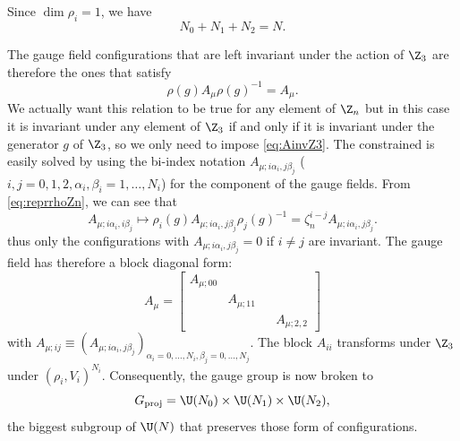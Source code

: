 \documentclass{worksheetclass}
\begin{document}
            Since $\dim\rho_i=1$, we have
            \begin{equation}
                N_0+N_1+N_2=N.\label{eq:sumNiZ3}
            \end{equation} 
            
            The gauge field configurations that are left invariant under the action of $\Z_3$ are therefore the ones that satisfy
            \begin{equation}
                \rho(g)A_\mu\rho(g)^{-1}=A_\mu.\label{eq:AinvZ3}
            \end{equation}
            We actually want this relation to be true for any element of $\Z_n$ but in this case it is invariant under any element of $\Z_3$ if and only if it is invariant under the generator $g$ of $\Z_3$, so we only need to impose \eqref{eq:AinvZ3}. The constrained is easily solved by using the bi-index notation $A_{\mu;i\alpha_i,j\beta_j}$ ($i,j=0,1,2,\alpha_i,\beta_i=1,\dots,N_i$) for the component of the gauge fields. From \eqref{eq:reprrhoZn}, we can see that
            \begin{equation}
                A_{\mu;i\alpha_i,i\beta_j}\mapsto \rho_i(g)A_{\mu;i\alpha_i,j\beta_j}\rho_j(g)^{-1}=\zeta^{i-j}_nA_{\mu;i\alpha_i,j\beta_j}.
            \end{equation}
            thus only the configurations with $A_{\mu;i\alpha_i,j\beta_j}=0$ if $i\neq j$ are invariant. The gauge field has therefore a block diagonal form:
            \begin{equation}
                A_\mu=
                \begin{bmatrix}
                    A_{\mu;00} & & \\
                    & A_{\mu;11} & \\
                    & & & A_{\mu;2,2}
                \end{bmatrix}
            \end{equation}
            with $A_{\mu;ij}\equiv (A_{\mu;i\alpha_i,j\beta_j})_{\alpha_i=0,\dots,N_i,\beta_j=0,\dots,N_j}$. The block $A_{ii}$ transforms under $\Z_3$ under $(\rho_i,V_i)^{N_i}$.
            Consequently, the gauge group is now broken to
            \begin{equation}
                G_{\text{proj}}=\U(N_0)\times\U(N_1)\times\U(N_2),
            \end{equation}
            the biggest subgroup of $\U(N)$ that preserves those form of configurations.
            
\end{document}
